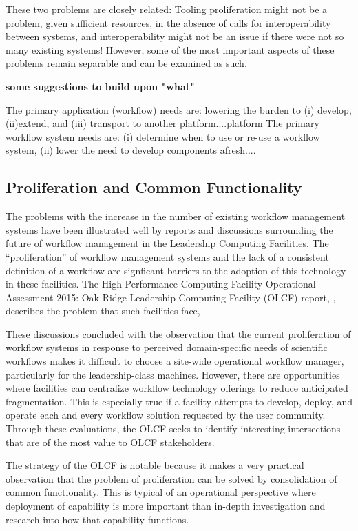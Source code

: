 These two problems are closely related: Tooling proliferation might not be a
problem, given sufficient resources, in the absence of calls for
interoperability between systems, and interoperability might not be an issue if
there were not so many existing systems! However, some of the most important
aspects of these problems remain separable and can be examined as such.

{\bf some suggestions to  build upon "what"} 

The primary application (workflow) needs are: lowering the burden to (i) develop, (ii)extend, and (iii) transport to another platform....platform The primary workflow system needs are: (i) determine when to use or re-use a workflow system, (ii) lower the need to develop components afresh....



\subsection{Proliferation and Common Functionality} \label{commonFunc}

The problems with the increase in the number of existing workflow management
systems have been illustrated well by reports and discussions surrounding the
future of workflow management in the Leadership Computing Facilities. The
``proliferation'' of workflow management systems and the lack of a consistent
definition of a workflow are signficant barriers to the adoption of this
technology in these facilities. The High Performance Computing Facility
Operational Assessment 2015: Oak Ridge Leadership Computing Facility (OLCF)
report, \cite{barker_scientific_2007}, describes the problem that such
facilities face, 
\begin{displayquote} These discussions concluded with the
observation that the current proliferation of workflow systems in response to
perceived domain-specific needs of scientific workflows makes it difficult to
choose a site-wide operational workflow manager, particularly for the
leadership-class machines. However, there are opportunities where facilities can
centralize workflow technology offerings to reduce anticipated fragmentation.
This is especially true if a facility attempts to develop, deploy, and operate
each and every workflow solution requested by the user community. Through these
evaluations, the OLCF seeks to identify interesting intersections that are of
the most value to OLCF stakeholders.
\end{displayquote} 
The strategy of the OLCF is notable because it makes a very practical observation that the problem of proliferation can be solved by consolidation of common functionality. This is
typical of an operational perspective where deployment of capability is more important than in-depth investigation and research into how that capability functions. 

